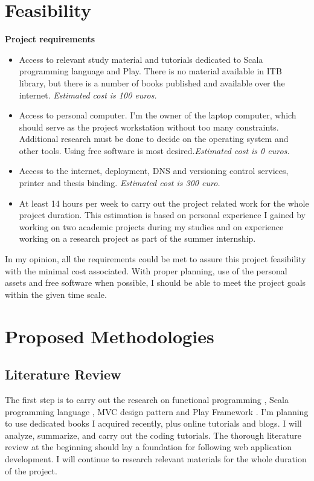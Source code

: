 \documentclass[12pt,twoside,a4paper]{report}
\begin{document}
\section{Feasibility}\label{1.5}
\textbf{Project requirements}
\begin{itemize}\itemsep1pt \parskip0pt 
\item Access to relevant study material and tutorials dedicated to Scala programming language and Play. There is no material available in ITB library, but there is a number of books published and available over the internet. \textit{Estimated cost is 100 euros.}
\item Access to personal computer. I'm the owner of the laptop computer, which should serve as the project workstation without too many constraints. Additional research must be done to decide on the operating system and other tools. Using free software is most desired.\textit{Estimated cost is 0 euros.}
\item Access to the internet, deployment, DNS and versioning control services, printer and thesis binding.\textit{ Estimated cost is 300 euro.}
\item At least 14 hours per week to carry out the project related work for the whole project duration. This estimation is based on personal experience I gained by working on two academic projects during my studies and on experience working on a research project as part of the summer internship.
\end{itemize}
In my opinion, all the requirements could be met to assure this project feasibility with the minimal cost associated. With proper planning, use of the personal assets and free software when possible, I should be able to meet the project goals within the given time scale.

\section{Proposed Methodologies}\label{1.6}

\subsection{Literature Review}\label{1.6.1}
The first step is to carry out the research on functional programming \cite{9}, Scala programming language \cite{10}, MVC design pattern and Play Framework \cite{11}. I'm planning to use dedicated books I acquired recently, plus online tutorials and blogs. I will analyze, summarize, and carry out the coding tutorials. The thorough literature review at the beginning should lay a foundation for following web application development. I will continue to research relevant materials for the whole duration of the project.
\end{document}

